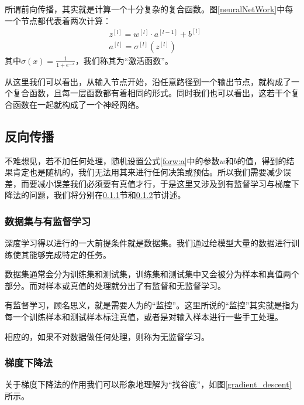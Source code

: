 \documentclass[UTF8]{ctexart}
\begin{document}
    		\indent 所谓前向传播，其实就是计算一个十分复杂的复合函数。图\ref{neuralNetWork}中每一个节点都代表着两次计算：
    		\begin{align}
    			&{z}^{[l]}={w}^{[l]}\cdot{a}^{[l-1]}+{b}^{[l]} \label{forw:z} \\
    			&{{a}^{[l]}}={{\sigma}^{[l]}}\left({{z}^{[l]}}\right) \label{forw:a}
    		\end{align}
    		其中$\sigma(x)=\frac{1}{1+e^{-x}}$，我们称其为“激活函数”。
    		
    		\indent 从这里我们可以看出，从输入节点开始，沿任意路径到一个输出节点，就构成了一个复合函数，且每一层函数都有着相同的形式。同时我们也可以看出，这若干个复合函数在一起就构成了一个神经网络。
    		
    	\subsection{反向传播}\label{backward}
    		
    		\indent 不难想见，若不加任何处理，随机设置公式\ref{forw:a}中的参数$w$和$b$的值，得到的结果肯定也是随机的，我们无法用其来进行任何决策或预估。所以我们需要减少误差，而要减小误差我们必须要有真值才行，于是这里又涉及到有监督学习与梯度下降法的问题，我们将分别在\ref{datasets}节和\ref{梯度下降法}节讲述。
    		
    		
    		\subsubsection{数据集与有监督学习}\label{datasets}
    			\indent 深度学习得以进行的一大前提条件就是数据集。我们通过给模型大量的数据进行训练使其能够完成特定的任务。
    			
    			\indent 数据集通常会分为训练集和测试集，训练集和测试集中又会被分为样本和真值两个部分。而对样本或真值的处理就分出了有监督和无监督学习。
    						
    			\indent 有监督学习，顾名思义，就是需要人为的“监控”。这里所说的“监控”其实就是指为每一个训练样本和测试样本标注真值，或者是对输入样本进行一些手工处理。
    			
    			\indent 相应的，如果不对数据做任何处理，则称为无监督学习。
    			
    		\subsubsection{梯度下降法}\label{梯度下降法}
    			\indent 关于梯度下降法的作用我们可以形象地理解为“找谷底”，如图\ref{gradient_descent}所示。
    			
\end{document}
